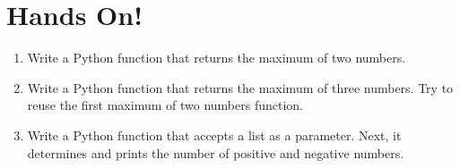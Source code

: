 \documentclass[aspectratio=1610,slidestop]{beamer}
\begin{document}
\section{Hands On!}

\begin{pframe}
 \vspace{-0.5cm}
 \begin{enumerate}
  \item Write a Python function that returns the maximum of two numbers.
  \item Write a Python function that returns the maximum of three numbers.
  Try to reuse the first maximum of two numbers function.
  \item Write a Python function that accepts a list as a parameter.
  Next, it determines and prints the number of positive and negative numbers.
 \end{enumerate}
\end{pframe}


\end{document}
